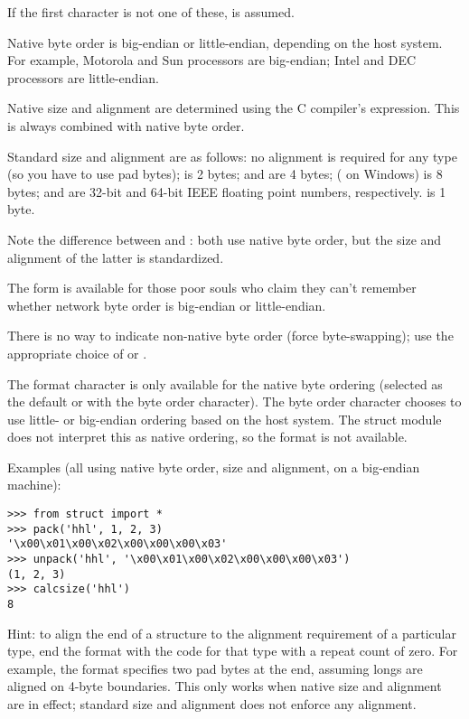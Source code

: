 If the first character is not one of these,  is assumed.

Native byte order is big-endian or little-endian, depending on the
host system.  For example, Motorola and Sun processors are big-endian;
Intel and DEC processors are little-endian.

Native size and alignment are determined using the C compiler's
 expression.  This is always combined with native byte
order.

Standard size and alignment are as follows: no alignment is required
for any type (so you have to use pad bytes);
 is 2 bytes;
 and  are 4 bytes;
 ( on Windows) is 8 bytes;
 and  are 32-bit and 64-bit
IEEE floating point numbers, respectively.
 is 1 byte.

Note the difference between  and \character{=}: both use
native byte order, but the size and alignment of the latter is
standardized.

The form \character{!} is available for those poor souls who claim they
can't remember whether network byte order is big-endian or
little-endian.

There is no way to indicate non-native byte order (force
byte-swapping); use the appropriate choice of \character{<} or
\character{>}.

The  format character is only available for the native
byte ordering (selected as the default or with the  byte
order character). The byte order character \character{=} chooses to
use little- or big-endian ordering based on the host system. The
struct module does not interpret this as native ordering, so the
 format is not available.

Examples (all using native byte order, size and alignment, on a
big-endian machine):

\begin{verbatim}
>>> from struct import *
>>> pack('hhl', 1, 2, 3)
'\x00\x01\x00\x02\x00\x00\x00\x03'
>>> unpack('hhl', '\x00\x01\x00\x02\x00\x00\x00\x03')
(1, 2, 3)
>>> calcsize('hhl')
8
\end{verbatim}

Hint: to align the end of a structure to the alignment requirement of
a particular type, end the format with the code for that type with a
repeat count of zero.  For example, the format 
specifies two pad bytes at the end, assuming longs are aligned on
4-byte boundaries.  This only works when native size and alignment are
in effect; standard size and alignment does not enforce any alignment.

